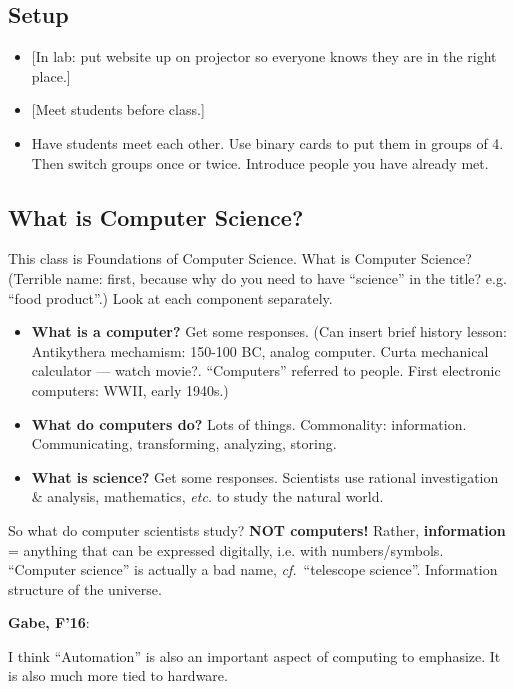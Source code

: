 \documentclass{article}
\newcommand{\etc}{\emph{etc.}\xspace}
\newenvironment{reflect}[1]
{
  \noindent
  \begin{lrbox}{\reflectbox}
    \begin{minipage}[t]{\textwidth}
      \textbf{#1}:
}{
    \end{minipage}
  \end{lrbox}
  \fbox{\usebox{\reflectbox}}
}
\begin{document}
\subsection*{Setup}

\begin{itemize}
\item {}[In lab: put website up on projector so everyone knows they are
  in the right place.]
\item {}[Meet students before class.]
\item Have students meet each other. Use binary cards to put them in
  groups of 4.  Then switch groups once or twice.  Introduce people
  you have already met.
\end{itemize}

\subsection*{What is Computer Science?}

This class is Foundations of Computer Science.  What is Computer
Science?  (Terrible name: first, because why do you need to have
``science'' in the title?  e.g. ``food product''.)  Look at each
component separately.
\begin{itemize}
\item \textbf{What is a computer?}  Get some responses.  (Can insert
  brief history lesson: Antikythera mechamism: 150-100 BC, analog
  computer.  Curta mechanical calculator --- watch
  movie?. ``Computers'' referred to people.  First electronic
  computers: WWII, early 1940s.)
\item \textbf{What do computers do?}  Lots of things.  Commonality:
  information.  Communicating, transforming, analyzing, storing.
\item \textbf{What is science?}  Get some responses.  Scientists use
  rational investigation \& analysis, mathematics, \etc to study the
  natural world.
\end{itemize}

So what do computer scientists study?  \textbf{NOT computers!}
Rather, \textbf{information} = anything that can be expressed digitally,
i.e. with numbers/symbols.  ``Computer science'' is actually a bad
name, \emph{cf.}\ ``telescope science''.  Information structure of the
universe.

\begin{reflect}{Gabe, F'16}
I think ``Automation'' is also an important aspect of computing to emphasize. It is also much more tied to hardware.
\end{reflect}
\end{document}
